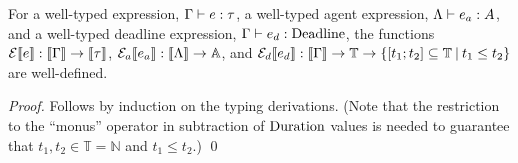 \documentclass[orivec,final]{llncs-href}
\newcommand{\nat}{\mathbb{N}}
\newcommand{\timeset}{\mathbb{T}}
\newcommand{\agentset}{\mathbb{A}}
\newcommand{\dendom}[1]{\llbracket #1 \rrbracket}
\newcommand{\type}{\tau}
\begin{document}
\begin{lemma}
  For a well-typed expression, $\ctexp{\Gamma}{e}{\type}$, a well-typed
  agent expression, $\Lambda \vdash e_a : A$, and a well-typed
  deadline expression, $\Gamma \vdash e_d : \mathrm{Deadline}$, the functions
  $\cdenexp{e} : \dendom{\Gamma} \to \dendom{\type}$, $\cdenaexp{e_a} :
  \dendom{\Lambda} \to \agentset$, and $\cdendexp{e_d} : \dendom{\Gamma}
  \to \timeset \to \left\{ [t_1;t_2] \subseteq \timeset \mathbin{|} t_1
    \leq t_2 \right\}$ are well-defined.
\end{lemma}
\begin{proof}
  Follows by induction on the typing derivations. (Note that the
  restriction to the ``monus'' operator in subtraction of $\mathrm{Duration}$
  values is needed to guarantee that $t_1,t_2 \in \timeset = \nat$ and
  $t_1 \leq t_2$.)
  \qed
\end{proof}
\end{document}
